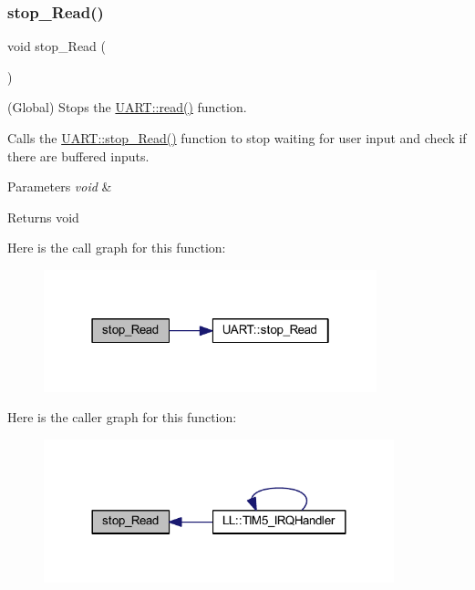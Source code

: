 \subsubsection{\texorpdfstring{stop\+\_\+\+Read()}{stop\_Read()}}
{\footnotesize\ttfamily void stop\+\_\+\+Read (\begin{DoxyParamCaption}{ }\end{DoxyParamCaption})}



(Global) Stops the \mbox{\hyperlink{namespace_u_a_r_t_a1087fba97ca797e5ca155228ff9eec55}{U\+A\+R\+T\+::read()}} function. 

Calls the \mbox{\hyperlink{namespace_u_a_r_t_a996ffefd3d2ce666720596342364db03}{U\+A\+R\+T\+::stop\+\_\+\+Read()}} function to stop waiting for user input and check if there are buffered inputs.


\begin{DoxyParams}{Parameters}
{\em void} & \\
\hline
\end{DoxyParams}
\begin{DoxyReturn}{Returns}
void 
\end{DoxyReturn}
Here is the call graph for this function\+:\nopagebreak
\begin{figure}[H]
\begin{center}
\leavevmode
\includegraphics[width=274pt]{namespace_i_o_a04c5db8c053f07761c5c09894a4bd49d_cgraph}
\end{center}
\end{figure}
Here is the caller graph for this function\+:\nopagebreak
\begin{figure}[H]
\begin{center}
\leavevmode
\includegraphics[width=288pt]{namespace_i_o_a04c5db8c053f07761c5c09894a4bd49d_icgraph}
\end{center}
\end{figure}
\mbox{\label{namespace_i_o_a20b32a5769a95ed363726431c01702e9}} 
